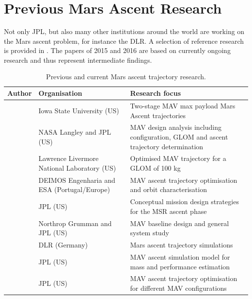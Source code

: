 
\section{Previous Mars Ascent Research}
\label{sec:previousMarsAscentResearch}
Not only \ac{JPL}, but also many other institutions around the world are working on the Mars ascent problem, for instance the \ac{DLR}. A selection of reference research is provided in . The papers of 2015 and 2016 are based on currently ongoing research and thus represent intermediate findings.

\begin{table}[H]
\begin{center}
\caption{Previous and current Mars ascent trajectory research.}
\label{tab:referenceResearch}
\begin{tabularx}{1.0\textwidth}{|X|X|X|}
\hline 
\textbf{Author} 	& \textbf{Organisation} & \textbf{Research focus} \\ \hline \hline
\cite{fanning1996model} & Iowa State University (US) & Two-stage \ac{MAV} max payload Mars Ascent trajectories \\ \hline
\cite{desai1998}& \ac{NASA} Langley and \ac{JPL} (US) & \ac{MAV} design analysis including configuration, \ac{GLOM} and ascent trajectory determination \\ \hline
\cite{whitehead2004mars,whitehead2005} & Lawrence Livermore National Laboratory (US)& Optimised \ac{MAV} trajectory for a \ac{GLOM} of 100 kg \\ \hline
 \cite{di2007system} & DEIMOS Engenharia and \acs{ESA} (Portugal/Europe) & \ac{MAV} ascent trajectory optimisation and orbit characterisation \\ \hline
\cite{woolley2011mars} & \ac{JPL} (US) & Conceptual mission design strategies for the \ac{MSR} ascent phase \\ \hline
\cite{trinidad2012} & Northrop Grumman and \ac{JPL} (US) & \ac{MAV} baseline design and general system study  \\ \hline
\cite{dumont2015design} & \ac{DLR} (Germany)		& Mars ascent trajectory simulations \\ \hline
\cite{woolley2015simple}  & \ac{JPL} (US) & \ac{MAV} ascent simulation model for mass and performance estimation \\ \hline
\cite{benito2016trajectory}  & \ac{JPL} (US) & \ac{MAV} ascent trajectory optimisation for different \ac{MAV} configurations \\ \hline

\end{tabularx}
\end{center}
\end{table}

